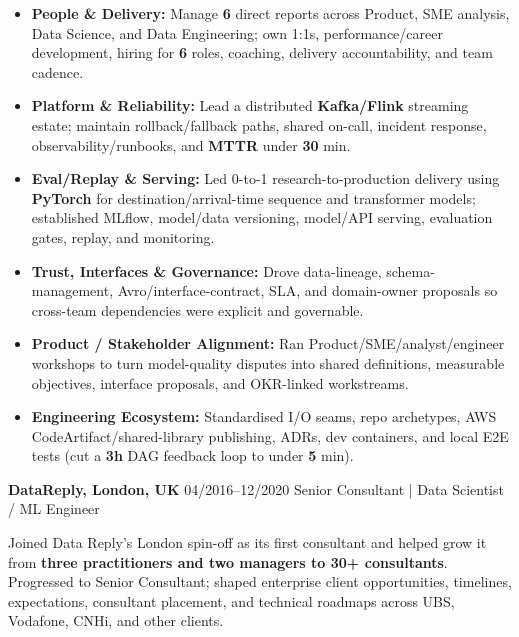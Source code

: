 \documentclass[]{../../friggeri-cv}
\renewcommand{\entry}[4]{%
  \parbox[t]{\dimexpr\textwidth-\entryleftinset\relax}{%
    \textbf{#2}%
    {\footnotesize\addfontfeature{Color=lightgray}\hspace{0.6em}#1}%
    \hfill%
    {\small\color{textcolor} #3}\\%
    #4\vspace{\parsep}%
  }\\}
\begin{document}
\begin{entrylist}
{{        }
        \begin{itemize}[leftmargin=1.1em]
            \item \normalsize\textbf{People \& Delivery:} Manage \textbf{6} direct reports across Product, SME analysis, Data Science, and Data Engineering; own 1:1s, performance/career development, hiring for \textbf{6} roles, coaching, delivery accountability, and team cadence.
            \item \normalsize\textbf{Platform \& Reliability:} Lead a distributed \textbf{Kafka/Flink} streaming estate; maintain rollback/fallback paths, shared on-call, incident response, observability/runbooks, and \textbf{MTTR} under \textbf{30} min.
            \item \normalsize\textbf{Eval/Replay \& Serving:} Led 0-to-1 research-to-production delivery using \textbf{PyTorch} for destination/arrival-time sequence and transformer models; established ML{f}low, model/data versioning, model/API serving, evaluation gates, replay, and monitoring.
            \item \normalsize\textbf{Trust, Interfaces \& Governance:} Drove data-lineage, schema-management, Avro/interface-contract, SLA, and domain-owner proposals so cross-team dependencies were explicit and governable.
            \item \normalsize\textbf{Product / Stakeholder Alignment:} Ran Product/SME/analyst/engineer workshops to turn model-quality disputes into shared definitions, measurable objectives, interface proposals, and OKR-linked workstreams.
            \item \normalsize\textbf{Engineering Ecosystem:} Standardised I/O seams, repo archetypes, AWS CodeArtifact/shared-library publishing, ADRs, dev containers, and local E2E tests (cut a \textbf{3h} DAG feedback loop to under \textbf{5} min).
        \end{itemize}
    }
    \entry
    {04/2016--12/2020}
    {DataReply, London, UK}
    {Senior Consultant | Data Scientist / ML Engineer}
    {
        {\normalsize
        \setlength{\parindent}{0pt}
        \setlength{\leftskip}{0pt}
        Joined Data Reply's London spin-off as its first consultant and helped grow it from \textbf{three practitioners and two managers to 30+ consultants}. Progressed to Senior Consultant; shaped enterprise client opportunities, timelines, expectations, consultant placement, and technical roadmaps across UBS, Vodafone, CNHi, and other clients.

}}
\end{entrylist}
\end{document}

